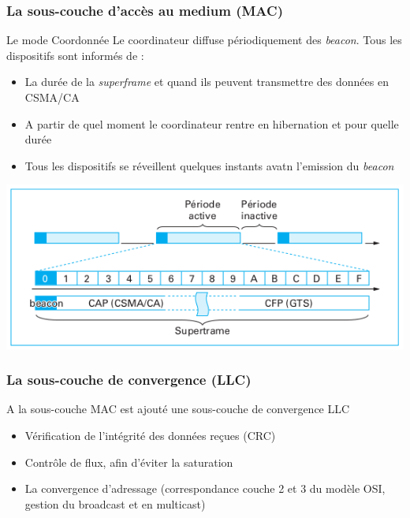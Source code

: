 \documentclass{beamer}
\begin{document}
  \begin{frame}
    \frametitle{La sous-couche d'accès au medium (MAC)}
    \begin{block}{Le mode Coordonnée}
      Le coordinateur diffuse périodiquement des \textit{beacon}. Tous les dispositifs sont informés de :
      \begin{itemize}
        \item La durée de la \textit{superframe} et quand ils peuvent transmettre des données en CSMA/CA
        \item A partir de quel moment le coordinateur rentre en hibernation et pour quelle durée
        \item Tous les dispositifs se réveillent quelques instants avatn l'emission du \textit{beacon}
      \end{itemize}
    \end{block}
  \end{frame}
  
  \begin{frame}
    \begin{center}
    \includegraphics[scale=0.6]{Supertrame.png}
    \end{center} 
  \end{frame}


  \begin{frame}
    \frametitle{La sous-couche de convergence (LLC)}
    \begin{block}{A la sous-couche MAC est ajouté une sous-couche de convergence LLC}
    \begin{itemize}
      \item Vérification de l'intégrité des données reçues (CRC)
      \item Contrôle de flux, afin d'éviter la saturation
      \item La convergence d'adressage (correspondance couche 2 et 3 du modèle OSI, gestion du broadcast et en multicast)
    \end{itemize}
    \end{block}
  \end{frame}
\end{document}
